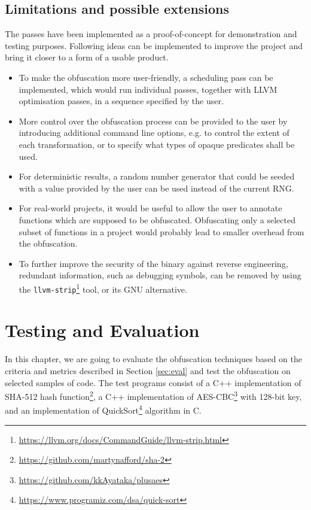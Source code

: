 \documentclass[
  digital, %
  notable,   %
  twoside, %
  nolof,     %
  nolot,     %
]{fithesis3}
\theoremstyle{definition}
\begin{document}
\section{Limitations and possible extensions}
The passes have been implemented as a proof-of-concept for demonstration and testing purposes. Following ideas can be implemented to improve the project and bring it closer to a form of a usable product.
\begin{itemize}
    \item To make the obfuscation more user-friendly, a scheduling pass can be implemented, which would run individual passes, together with LLVM optimisation passes, in a sequence specified by the user. 
    \item More control over the obfuscation process can be provided to the user by introducing additional command line options, e.g. to control the extent of each transformation, or to specify what types of opaque predicates shall be used. 
    \item For deterministic results, a random number generator that could be seeded with a value provided by the user can be used instead of the current RNG. 
    \item For real-world projects, it would be useful to allow the user to annotate functions which are supposed to be obfuscated. Obfuscating only a selected subset of functions in a project would probably lead to smaller overhead from the obfuscation. 
    \item To further improve the security of the binary against reverse engineering, redundant information, such as debugging symbols, can be removed by using the \texttt{llvm-strip}\footnote{\url{https://llvm.org/docs/CommandGuide/llvm-strip.html}} tool, or its GNU alternative. 
\end{itemize}

\chapter{Testing and Evaluation} \label{chap:eval}
In this chapter, we are going to evaluate the obfuscation techniques based on the criteria and metrics described in Section \ref{sec:eval} 
and test the obfuscation on selected samples of code. The test programs consist of a C++ implementation of SHA-512 hash function\footnote{\url{https://github.com/martynafford/sha-2}}, a C++ implementation of AES-CBC\footnote{\url{https://github.com/kkAyataka/plusaes}} with 128-bit key, and an implementation of QuickSort\footnote{\url{https://www.programiz.com/dsa/quick-sort}} algorithm in C.
\end{document}
